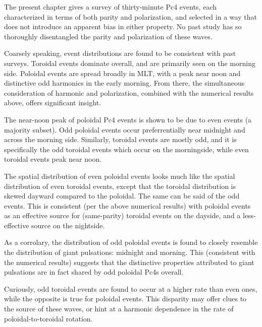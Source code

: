 \documentclass[jgrga]{agutex}
\begin{document}
\begin{article}



The present chapter gives a survey of  thirty-minute Pc4
events, each characterized in terms of both parity and polarization, and
selected in a way that does not introduce an apparent bias in either
property. No past study has so thoroughly disentangled the parity and
polarization of these waves.

Coarsely speaking, event distributions are found to be consistent with
past surveys. Toroidal events dominate overall, and are primarily seen
on the morning side. Poloidal events are spread broadly in MLT, with a
peak near noon and distinctive odd harmonics in the early morning. From
there, the simultaneous consideration of harmonic and polarization,
combined with the numerical results above, offers significant insight. 

The near-noon peak of poloidal Pc4 events is shown to be due to even
events (a majority subset). Odd poloidal events occur preferrentially
near midnight and across the morning side. Similarly, toroidal events
are mostly odd, and it is specifically the odd toroidal events which
occur on the morningside, while even toroidal events peak near noon. 

The spatial distribution of even poloidal events looks much like the
spatial distribution of even toroidal events, except that the toroidal
distribution is skewed dayward compared to the poloidal. The same can be
said of the odd events. This is consistent (per the above numerical
results) with poloidal events as an effective source for (same-parity)
toroidal events on the dayside, and a less-effective source on the
nightside. 

As a corrolary, the distribution of odd poloidal events is found to
closely resemble the distribution of giant pulsations: midnight and
morning. This (consistent with the numerical results) suggests that the
distinctive properties attributed to giant pulsations are in fact shared
by odd poloidal Pc4s overall. 

Curiously, odd toroidal events are found to occur at a higher rate than
even ones, while the opposite is true for poloidal events. This
disparity may offer clues to the source of these waves, or hint at a
harmonic dependence in the rate of poloidal-to-toroidal rotation. 



\end{article}
\end{document}
